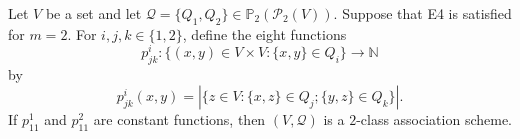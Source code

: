 Let $V$ be a set and let $\mathcal{Q} = \{Q_1, Q_2\} \in \mathbb{P}_2(\mathcal{P}_2(V))$. Suppose that E4 is satisfied for $m = 2$. For $i, j, k \in \{1, 2\}$, define the eight functions
$$p_{jk}^i: \{(x, y) \in V \times V : \{x, y\} \in Q_i\} \rightarrow \mathbb{N}$$
by
$$p_{jk}^i(x, y) = |\{z \in V : \{x, z\} \in Q_j; \{y, z\} \in Q_k\}|.$$
If $p_{11}^1$ and $p_{11}^2$ are constant functions, then $(V, \mathcal{Q})$ is a $2$-class association scheme.
